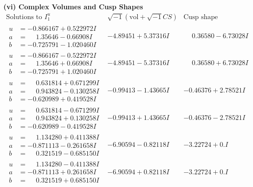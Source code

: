 \documentclass[1p]{elsarticle_modified}
\theoremstyle{definition}
\newcommand{\I}{\sqrt{-1}}
\begin{document}
\newpage\flushleft \textbf{(vi) Complex Volumes and Cusp Shapes}
$$\begin{array}{c|c|c}  
\text{Solutions to }I^u_{1}& \I (\text{vol} + \sqrt{-1}CS) & \text{Cusp shape}\\
 \hline 
\begin{aligned}
u &= -0.866167 + 0.522972 I \\
a &= \phantom{-}1.35646 - 0.66908 I \\
b &= -0.725791 - 1.020460 I\end{aligned}
 & -4.89451 + 5.37316 I & \phantom{-}0.36580 - 6.73028 I \\ \hline\begin{aligned}
u &= -0.866167 - 0.522972 I \\
a &= \phantom{-}1.35646 + 0.66908 I \\
b &= -0.725791 + 1.020460 I\end{aligned}
 & -4.89451 - 5.37316 I & \phantom{-}0.36580 + 6.73028 I \\ \hline\begin{aligned}
u &= \phantom{-}0.631814 + 0.671299 I \\
a &= \phantom{-}0.943824 - 0.130258 I \\
b &= -0.620989 + 0.419528 I\end{aligned}
 & -0.99413 - 1.43665 I & -0.46376 + 2.78521 I \\ \hline\begin{aligned}
u &= \phantom{-}0.631814 - 0.671299 I \\
a &= \phantom{-}0.943824 + 0.130258 I \\
b &= -0.620989 - 0.419528 I\end{aligned}
 & -0.99413 + 1.43665 I & -0.46376 - 2.78521 I \\ \hline\begin{aligned}
u &= \phantom{-}1.134280 + 0.411388 I \\
a &= -0.871113 - 0.261658 I \\
b &= \phantom{-}0.321519 - 0.685150 I\end{aligned}
 & -6.90594 - 0.82118 I & -3.22724 + 0. I\phantom{ +0.000000I} \\ \hline\begin{aligned}
u &= \phantom{-}1.134280 - 0.411388 I \\
a &= -0.871113 + 0.261658 I \\
b &= \phantom{-}0.321519 + 0.685150 I\end{aligned}
 & -6.90594 + 0.82118 I & -3.22724 + 0. I\phantom{ +0.000000I} \\ \hline\begin{aligned}

\end{aligned}
\end{array}$$
\end{document}
